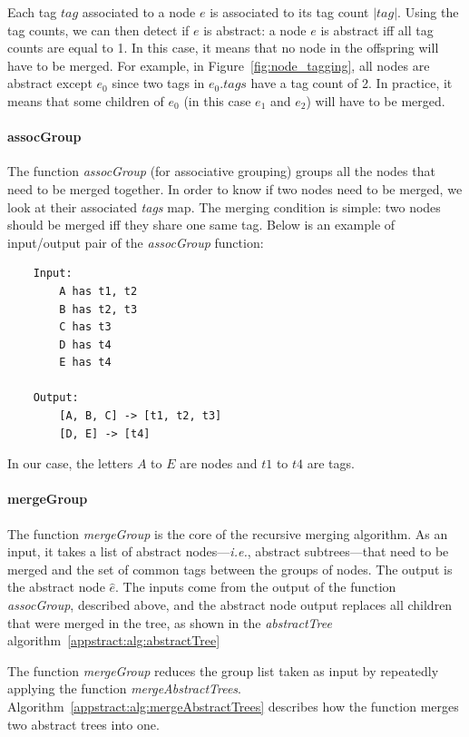 Each tag $tag$ associated to a node $e$ is associated to its tag count $|tag|$.
Using the tag counts, we can then detect if $e$ is abstract: a node $e$ is abstract iff all tag counts are equal to 1.
In this case, it means that no node in the offspring will have to be merged.
For example, in Figure~\ref{fig:node_tagging}, all nodes are abstract except $e_{0}$ since two tags in $e_{0}.tags$ have a tag count of 2.
In practice, it means that some children of $e_{0}$ (in this case $e_{1}$ and $e_{2}$) will have to be merged.

\paragraph{assocGroup}\label{par:assocGroup}
The function \emph{assocGroup} (for associative grouping) groups all the nodes that need to be merged together.
In order to know if two nodes need to be merged, we look at their associated \emph{tags} map.
The merging condition is simple: two nodes should be merged iff they share one same tag.
Below is an example of input/output pair of the \emph{assocGroup} function:
\begin{lstlisting}
    Input:
        A has t1, t2
        B has t2, t3
        C has t3
        D has t4
        E has t4

    Output:
        [A, B, C] -> [t1, t2, t3]
        [D, E] -> [t4]
\end{lstlisting}

In our case, the letters $A$ to $E$ are nodes and $t1$ to $t4$ are tags.

\paragraph{mergeGroup}\label{par:mergeGroup}
The function \emph{mergeGroup} is the core of the recursive merging algorithm.
As an input, it takes a list of abstract nodes---\emph{i.e.}, abstract subtrees---that need to be merged and the set of common tags between the groups of nodes.
The output is the abstract node $\hat{e}$.
The inputs come from the output of the function \emph{assocGroup}, described above, and the abstract node output replaces all children that were merged in the tree, as shown in the \emph{abstractTree} algorithm~\ref{appstract:alg:abstractTree}

The function \emph{mergeGroup} reduces the group list taken as input by repeatedly applying the function \emph{mergeAbstractTrees}.
Algorithm~\ref{appstract:alg:mergeAbstractTrees} describes how the function merges two abstract trees into one.

